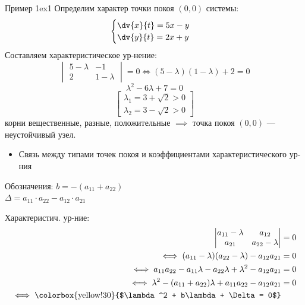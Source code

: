 \begin{example}{Пример 1}{ex1}
	Определим характер точки покоя $(0,0)$ системы:
	\begin{equation*}
		\begin{cases}
			\dv{x}{t} = 5x - y \\
			\dv{y}{t} = 2x + y
		\end{cases}
	\end{equation*}
	Составляем характеристическое ур-нение:
	\begin{equation*}
		\begin{vmatrix} 5-\lambda & -1 \\ 2 & 1-\lambda \end{vmatrix} = 0 \iff (5-\lambda)(1-\lambda) + 2 = 0
	\end{equation*}
	\begin{equation*}
		\lambda^2 - 6\lambda + 7 = 0
	\end{equation*}
	\begin{equation*}
		\begin{bmatrix}
			\lambda_1 = 3 + \sqrt{2} > 0 \\
			\lambda_2 = 3 - \sqrt{2} > 0
		\end{bmatrix}
	\end{equation*}
	корни вещественные, разные, положительные $\implies$ точка покоя $(0,0)$ --- неустойчивый узел.
\end{example}

\begin{itemize}
	\item Связь между типами точек покоя и коэффициентами характеристического ур-ния
\end{itemize}

Обозначения: $b = -(a_{11} + a_{22})$ \\
\hspace*{2.5cm} $\Delta = a_{11} \cdot a_{22} - a_{12} \cdot a_{21}$

Характеристич. ур-ние: 
\begin{align*}
	\begin{vmatrix} a_{11} - \lambda & a_{12} \\ a_{21} & a_{22} - \lambda \end{vmatrix} &= 0 \\
	\iff (a_{11} - \lambda)(a_{22} - \lambda) - a_{12}a_{21} &= 0 \\
	\iff a_{11}a_{22} - a_{11}\lambda - a_{22}\lambda + \lambda^2 - a_{12}a_{21} &= 0 \\
	\iff \lambda^2 - (a_{11} + a_{22})\lambda + a_{11}a_{22} - a_{12}a_{21} &= 0 \\
	\iff \text{\colorbox{yellow!30}{$\lambda^2 + b\lambda + \Delta = 0$}}
\end{align*}

